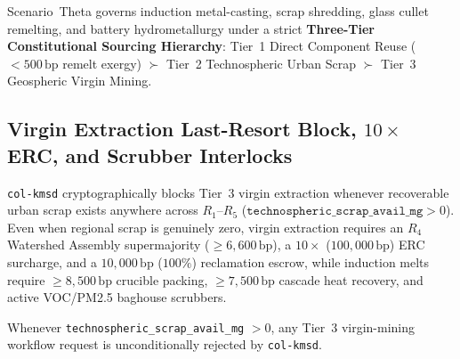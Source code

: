 Scenario~Theta governs induction metal-casting, scrap shredding, glass cullet remelting, and battery
hydrometallurgy under a strict \textbf{Three-Tier Constitutional Sourcing Hierarchy}: Tier~1 Direct
Component Reuse ($< 500\,\mathrm{bp}$ remelt exergy) $\succ$ Tier~2 Technospheric Urban Scrap $\succ$
Tier~3 Geospheric Virgin Mining.

\subsection{Virgin Extraction Last-Resort Block, $10\times$ ERC, and Scrubber Interlocks}

\texttt{col-kmsd} cryptographically blocks Tier~3 virgin extraction whenever recoverable urban scrap
exists anywhere across $R_1\text{--}R_5$ ($\mathtt{technospheric\_scrap\_avail\_mg} > 0$). Even when
regional scrap is genuinely zero, virgin extraction requires an $R_4$ Watershed Assembly supermajority
($\ge 6{,}600\,\mathrm{bp}$), a $10\times$ ($100{,}000\,\mathrm{bp}$) ERC surcharge, and a $10{,}000\,\mathrm{bp}$
($100\%$) reclamation escrow, while induction melts require $\ge 8{,}500\,\mathrm{bp}$ crucible
packing, $\ge 7{,}500\,\mathrm{bp}$ cascade heat recovery, and active VOC/PM2.5 baghouse scrubbers.

\begin{invariant}
\label{inv:waved-theta-scrap}
Whenever \texttt{technospheric\_scrap\_avail\_mg} $> 0$, any Tier~3 virgin-mining workflow request
is unconditionally rejected by \texttt{col-kmsd}.
\end{invariant}


